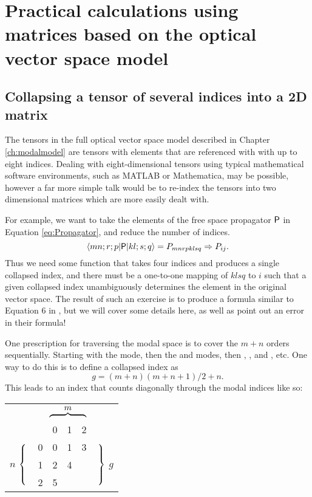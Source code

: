 \chapter{Practical calculations using matrices based on the optical vector space model}

\section{Collapsing a tensor of several indices into a 2D matrix}
The tensors in the full optical vector space model described in Chapter \ref{ch:modalmodel} are tensors with elements that are referenced with with up to eight indices. %
Dealing with eight-dimensional tensors using typical mathematical software environments, such as \mbox{MATLAB} or Mathematica, may be possible, however a far more simple talk would be to re-index the tensors into two dimensional matrices which are more easily dealt with.

For example, we want to take the elements of the free space propagator $\mathsf{P}$ in Equation \ref{eq:Propagator}, and reduce the number of indices.
\begin{equation}
\matrixel{mn;r;p}{\oper{P}}{kl;s;q} = P_{mnrpklsq} \Rightarrow P_{ij}.
\end{equation}
Thus we need some function that takes four indices and produces a single collapsed index, and there must be a one-to-one mapping of $klsq$ to $i$ such that a given collapsed index unambiguously determines the element in the original vector space. %
The result of such an exercise is to produce a formula similar to Equation 6 in \citet{Sigg:00}, but we will cover some details here, as well as point out an error in their formula!

One prescription for traversing the modal space is to cover the $m+n$ orders sequentially. %
Starting with the  mode, then the  and  modes, then , , and , etc. %
One way to do this is to define a collapsed index as
\begin{equation*}
g=(m+n)(m+n+1)/2 + n.
\end{equation*}
This leads to an index that counts diagonally through the modal indices like so:
\begin{center}
 \begin{tabular}{ r c|c c c l}
 \multicolumn{5}{r}{$\overbrace{\rule{1.5cm}{0pt}}^{\mbox{$m$}}$} \\
&  & 0 & 1 & 2 & \\
 \cline{2-5}
\multirow{3}{*}{ $n$ $\left\{ \rule{0pt}{1cm} \right. $}
& 0 & 0 & 1 & 3 & 
\multirow{3}{*}{ $\left. \rule{0pt}{1cm} \right\}$ $g$}\\ 
& 1 & 2 & 4 &   \\ 
& 2 & 5 &   &   \\ 
\end{tabular} 
\end{center}

